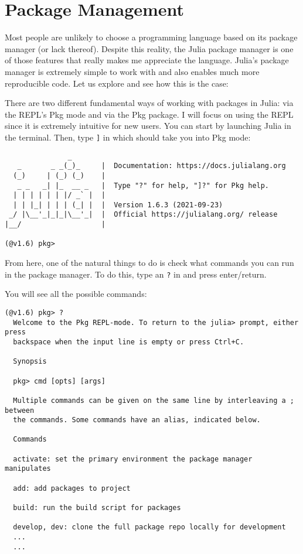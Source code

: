 \documentclass[
  notoc %
]{tufte-book}
\newcommand{\passthrough}[1]{#1}
\begin{document}
\hypertarget{sec:packages}{%
\section{Package Management}\label{sec:packages}}

Most people are unlikely to choose a programming language based on its
package manager (or lack thereof). Despite this reality, the Julia
package manager is one of those features that really makes me appreciate
the language. Julia's package manager is extremely simple to work with
and also enables much more reproducible code. Let us explore and see how
this is the case:

There are two different fundamental ways of working with packages in
Julia: via the REPL's Pkg mode and via the Pkg package. I will focus on
using the REPL since it is extremely intuitive for new users. You can
start by launching Julia in the terminal. Then, type
\passthrough{\lstinline!]!} in which should take you into Pkg mode:

\begin{lstlisting}
               _
   _       _ _(_)_     |  Documentation: https://docs.julialang.org
  (_)     | (_) (_)    |
   _ _   _| |_  __ _   |  Type "?" for help, "]?" for Pkg help.
  | | | | | | |/ _` |  |
  | | |_| | | | (_| |  |  Version 1.6.3 (2021-09-23)
 _/ |\__'_|_|_|\__'_|  |  Official https://julialang.org/ release
|__/                   |

(@v1.6) pkg> 
\end{lstlisting}

From here, one of the natural things to do is check what commands you
can run in the package manager. To do this, type an
\passthrough{\lstinline!?!} in and press enter/return.

You will see all the possible commands:

\begin{lstlisting}
(@v1.6) pkg> ?
  Welcome to the Pkg REPL-mode. To return to the julia> prompt, either press
  backspace when the input line is empty or press Ctrl+C.

  Synopsis

  pkg> cmd [opts] [args]

  Multiple commands can be given on the same line by interleaving a ; between
  the commands. Some commands have an alias, indicated below.

  Commands

  activate: set the primary environment the package manager manipulates

  add: add packages to project

  build: run the build script for packages

  develop, dev: clone the full package repo locally for development
  ...
  ...
\end{lstlisting}
\end{document}
